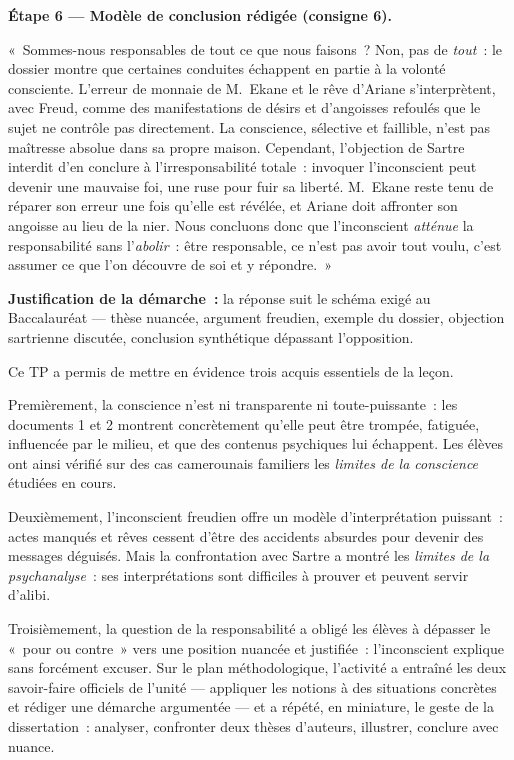 \documentclass[11pt]{article}
\newcommand{\cle}[1]{{\popxbold\color{popdark}#1}}
\newcounter{popsec}
\newcounter{popsub}
\newcommand{\courssub}[1]{%
  \stepcounter{popsub}%
  \par\vspace{9pt}\noindent{\popxbold\fontsize{11.5}{13}\selectfont\color{popink}{\color{poporange}\thepopsec.\thepopsub}\hspace{6pt}#1}\par\nopagebreak\vspace{4pt}
}
\begin{document}
\begin{exoresolu}
\textbf{Étape 6 — Modèle de conclusion rédigée (consigne 6).}\par
«~Sommes-nous responsables de tout ce que nous faisons~? Non, pas de \emph{tout}~: le dossier montre que certaines conduites échappent en partie à la volonté consciente. L'erreur de monnaie de M.~Ekane et le rêve d'Ariane s'interprètent, avec Freud, comme des manifestations de désirs et d'angoisses refoulés que le sujet ne contrôle pas directement. La conscience, sélective et faillible, n'est pas maîtresse absolue dans sa propre maison. Cependant, l'objection de Sartre interdit d'en conclure à l'irresponsabilité totale~: invoquer l'inconscient peut devenir une mauvaise foi, une ruse pour fuir sa liberté. M.~Ekane reste tenu de réparer son erreur une fois qu'elle est révélée, et Ariane doit affronter son angoisse au lieu de la nier. Nous concluons donc que l'inconscient \emph{atténue} la responsabilité sans l'\emph{abolir}~: être responsable, ce n'est pas avoir tout voulu, c'est assumer ce que l'on découvre de soi et y répondre.~»

\textbf{Justification de la démarche~:} la réponse suit le schéma exigé au Baccalauréat — thèse nuancée, argument freudien, exemple du dossier, objection sartrienne discutée, conclusion synthétique dépassant l'opposition.
\end{exoresolu}

\courssub{Bilan de l'activité}

Ce TP a permis de mettre en évidence trois acquis essentiels de la leçon.

Premièrement, la \cle{conscience} n'est ni transparente ni toute-puissante~: les documents 1 et 2 montrent concrètement qu'elle peut être trompée, fatiguée, influencée par le milieu, et que des contenus psychiques lui échappent. Les élèves ont ainsi vérifié sur des cas camerounais familiers les \emph{limites de la conscience} étudiées en cours.

Deuxièmement, l'\cle{inconscient} freudien offre un modèle d'interprétation puissant~: actes manqués et rêves cessent d'être des accidents absurdes pour devenir des messages déguisés. Mais la confrontation avec Sartre a montré les \emph{limites de la psychanalyse}~: ses interprétations sont difficiles à prouver et peuvent servir d'alibi.

Troisièmement, la question de la \cle{responsabilité} a obligé les élèves à dépasser le «~pour ou contre~» vers une position nuancée et justifiée~: l'inconscient explique sans forcément excuser. Sur le plan méthodologique, l'activité a entraîné les deux savoir-faire officiels de l'unité — appliquer les notions à des situations concrètes et rédiger une démarche argumentée — et a répété, en miniature, le geste de la dissertation~: analyser, confronter deux thèses d'auteurs, illustrer, conclure avec nuance.
\end{document}
